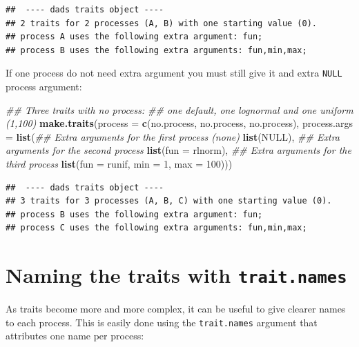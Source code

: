 \documentclass[]{book}
\newenvironment{Shaded}{\begin{snugshade}}{\end{snugshade}}
\newcommand{\CommentTok}[1]{\textcolor[rgb]{0.56,0.35,0.01}{\textit{#1}}}
\newcommand{\DataTypeTok}[1]{\textcolor[rgb]{0.13,0.29,0.53}{#1}}
\newcommand{\DecValTok}[1]{\textcolor[rgb]{0.00,0.00,0.81}{#1}}
\newcommand{\KeywordTok}[1]{\textcolor[rgb]{0.13,0.29,0.53}{\textbf{#1}}}
\newcommand{\NormalTok}[1]{#1}
\newcommand{\OtherTok}[1]{\textcolor[rgb]{0.56,0.35,0.01}{#1}}
\begin{document}
\begin{verbatim}
##  ---- dads traits object ---- 
## 2 traits for 2 processes (A, B) with one starting value (0).
## process A uses the following extra argument: fun;
## process B uses the following extra arguments: fun,min,max;
\end{verbatim}

If one process do not need extra argument you must still give it and extra \texttt{NULL} process argument:

\begin{Shaded}
\begin{Highlighting}[]
\CommentTok{## Three traits with no process:}
\CommentTok{## one default, one lognormal and one uniform (1,100)}
\KeywordTok{make.traits}\NormalTok{(}\DataTypeTok{process      =} \KeywordTok{c}\NormalTok{(no.process, no.process, no.process),}
            \DataTypeTok{process.args =} \KeywordTok{list}\NormalTok{(}\CommentTok{## Extra arguments for the first process (none)}
                                \KeywordTok{list}\NormalTok{(}\OtherTok{NULL}\NormalTok{),}
                                \CommentTok{## Extra arguments for the second process}
                                \KeywordTok{list}\NormalTok{(}\DataTypeTok{fun =}\NormalTok{ rlnorm),}
                                \CommentTok{## Extra arguments for the third process}
                                \KeywordTok{list}\NormalTok{(}\DataTypeTok{fun =}\NormalTok{ runif, }\DataTypeTok{min =} \DecValTok{1}\NormalTok{, }\DataTypeTok{max =} \DecValTok{100}\NormalTok{)))}
\end{Highlighting}
\end{Shaded}

\begin{verbatim}
##  ---- dads traits object ---- 
## 3 traits for 3 processes (A, B, C) with one starting value (0).
## process B uses the following extra argument: fun;
## process C uses the following extra arguments: fun,min,max;
\end{verbatim}

\hypertarget{naming-the-traits-with-trait.names}{%
\section{\texorpdfstring{Naming the traits with \texttt{trait.names}}{Naming the traits with trait.names}}\label{naming-the-traits-with-trait.names}}

As traits become more and more complex, it can be useful to give clearer names to each process.
This is easily done using the \texttt{trait.names} argument that attributes one name per process:
\end{document}
